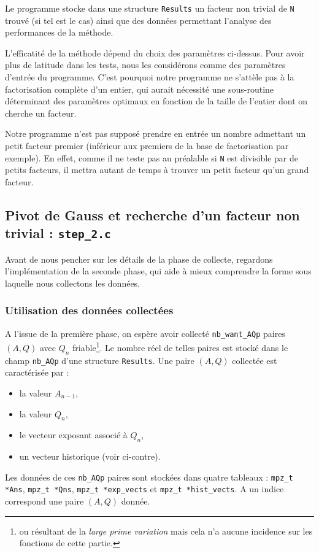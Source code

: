 Le programme stocke dans une structure \texttt{Results} un facteur non trivial
de \texttt{N} trouvé (si tel est le cas) ainsi que des données permettant 
l'analyse des performances de la méthode.  

\begin{remarque}
L'efficatité de la méthode dépend du choix des paramètres ci-dessus. Pour avoir
plus de latitude dans les tests, nous les considérons comme des paramètres 
d'entrée du programme. C'est pourquoi notre programme ne s'attèle pas à la
factorisation complète d'un entier, qui aurait nécessité une sous-routine 
déterminant des paramètres optimaux en fonction de la taille de l'entier 
dont on cherche un facteur. 
   
\end{remarque}

\begin{remarque}
Notre programme n'est pas supposé prendre en entrée un nombre admettant un petit
facteur premier (inférieur aux premiers de la base de factorisation par exemple).
En effet, comme il ne teste pas au préalable si \texttt{N} est divisible par de 
petits facteurs, il mettra autant de temps à trouver un petit facteur qu'un
grand facteur.
\end{remarque}

\newpage 
\subsection{Pivot de Gauss et recherche d'un facteur non trivial
            : \texttt{step\_2.c}}

Avant de nous pencher sur les détails de la phase de collecte, regardons 
l'implémentation de la seconde phase, qui aide à mieux comprendre la 
forme sous laquelle nous collectons les données.

\subsubsection{Utilisation des données collectées}
A l'issue de la première
phase, on espère avoir collecté \texttt{nb\_want\_AQp} paires $(A,Q)$ avec
$Q_n$ friable\footnote{ou résultant de la \textit{large prime variation} mais 
cela n'a aucune incidence sur les fonctions de cette partie.}. Le nombre
réel de telles paires est stocké dans le champ \texttt{nb\_AQp} d'une structure
\texttt{Results}. Une paire $(A,Q)$ collectée est caractérisée par :

\begin{itemize}
    \item la valeur $A_{n-1}$,
    \item la valeur $Q_n$,
    \item le vecteur exposant associé à $Q_n$,
    \item un vecteur historique (voir ci-contre).
\end{itemize}
Les données de ces \texttt{nb\_AQp} paires sont stockées dans
quatre tableaux : \texttt{mpz\_t *Ans}, \texttt{mpz\_t *Qns}, 
\texttt{mpz\_t *exp\_vects} et \texttt{mpz\_t *hist\_vects}.
A un indice correspond une paire $(A,Q)$ donnée. \\

